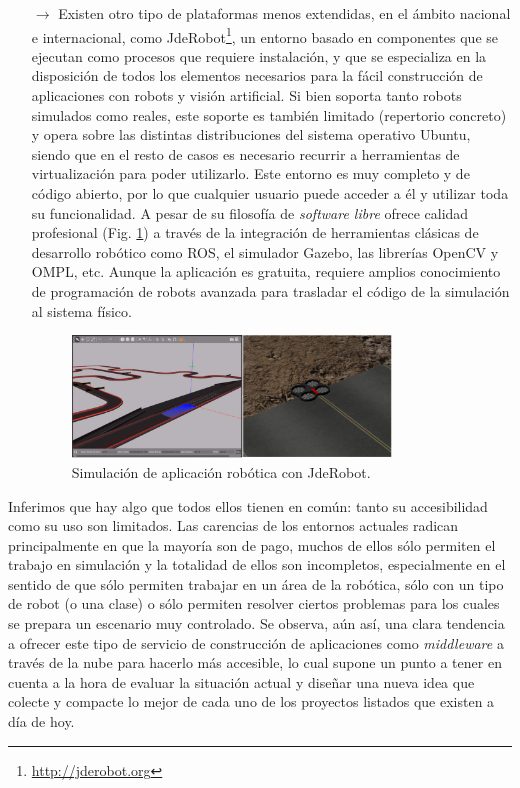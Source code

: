 \begin{itemize}
\item [$\rightarrow$] Existen otro tipo de plataformas menos extendidas, en el ámbito nacional e internacional, como JdeRobot\footnote{\url{http://jderobot.org}}, un entorno basado en componentes que se ejecutan como procesos que requiere instalación, y que se especializa en la disposición de todos los elementos necesarios para la fácil construcción de aplicaciones con robots y visión artificial. Si bien soporta tanto robots simulados como reales, este soporte es también limitado (repertorio concreto) y opera sobre las distintas distribuciones del sistema operativo Ubuntu, siendo que en el resto de casos es necesario recurrir a herramientas de virtualización para poder utilizarlo. Este entorno es muy completo y de código abierto, por lo que cualquier usuario puede acceder a él y utilizar toda su funcionalidad. A pesar de su filosofía de \textit{software libre} ofrece calidad profesional (Fig. \ref{jderobot}) a través de la integración de herramientas clásicas de desarrollo robótico como ROS, el simulador Gazebo, las librerías OpenCV y OMPL, etc. Aunque la aplicación es gratuita, requiere amplios conocimiento de programación de robots avanzada para trasladar el código de la simulación al sistema físico.

\begin{figure}[!hbtp]  \centering\noindent
    \includegraphics[width=0.8\textwidth]{figures/jderobot_simulation.png}
    \caption{Simulación de aplicación robótica con JdeRobot.}
    \label{jderobot}
\end{figure}

\end{itemize}

Inferimos que hay algo que todos ellos tienen en común: tanto su accesibilidad como su uso son limitados. Las carencias de los entornos actuales radican principalmente en que la mayoría son de pago, muchos de ellos sólo permiten el trabajo en simulación y la totalidad de ellos son incompletos, especialmente en el sentido de que sólo permiten trabajar en un área de la robótica, sólo con un tipo de robot (o una clase) o sólo permiten resolver ciertos problemas para los cuales se prepara un escenario muy controlado. Se observa, aún así, una clara tendencia a ofrecer este tipo de servicio de construcción de aplicaciones como \textit{middleware} a través de la nube para hacerlo más accesible, lo cual supone un punto a tener en cuenta a la hora de evaluar la situación actual y diseñar una nueva idea que colecte y compacte lo mejor de cada uno de los proyectos listados que existen a día de hoy.